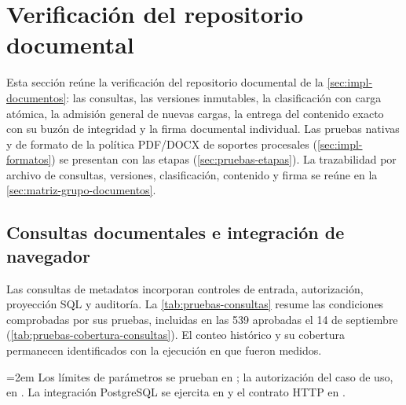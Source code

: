 
\section{Verificación del repositorio documental}\label{sec:pruebas-documentos}

Esta sección reúne la verificación del repositorio documental de la \cref{sec:impl-documentos}: las consultas, las versiones inmutables, la clasificación con carga atómica, la admisión general de nuevas cargas, la entrega del contenido exacto con su buzón de integridad y la firma documental individual. Las pruebas nativas y de formato de la política PDF/DOCX de soportes procesales (\cref{sec:impl-formatos}) se presentan con las etapas (\cref{sec:pruebas-etapas}). La trazabilidad por archivo de consultas, versiones, clasificación, contenido y firma se reúne en la \cref{sec:matriz-grupo-documentos}.

\subsection{Consultas documentales e integración de navegador}\label{sec:pruebas-consultas}

Las consultas de metadatos incorporan controles de entrada, autorización, proyección SQL y auditoría. La \cref{tab:pruebas-consultas} resume las condiciones comprobadas por sus pruebas, incluidas en las 539 aprobadas el 14 de septiembre (\cref{tab:pruebas-cobertura-consultas}). El conteo histórico y su cobertura permanecen identificados con la ejecución en que fueron medidos.

{\emergencystretch=2em Los límites de parámetros se prueban en ; la autorización del caso de uso, en . La integración PostgreSQL se ejercita en  y el contrato HTTP en .\par}

